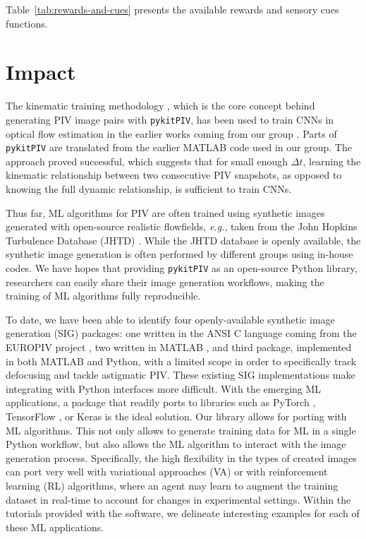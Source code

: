 \documentclass[a4paper,fleqn]{cas-dc}
\begin{document}
Table~\ref{tab:rewards-and-cues} presents the available rewards and sensory cues functions.

\section{Impact} \label{sec:results}

The kinematic training methodology \cite{manickathan2022kinematic}, which is the core concept behind generating PIV image pairs with \texttt{pykitPIV}, has been used to train CNNs in optical flow estimation in the earlier works coming from our group \cite{manickathan2022kinematic, manickathan2023lightweight, mucignat2023lightweight}. 
Parts of \texttt{pykitPIV} are translated from the earlier MATLAB code used in our group.
The approach proved successful, which suggests that for small enough $\Delta t$, learning the kinematic relationship between two consecutive PIV snapshots, as opposed to knowing the full dynamic relationship, is sufficient to train CNNs.

Thus far, ML algorithms for PIV are often trained using synthetic images generated with open-source realistic flowfields, \textit{e.g.}, taken from the John Hopkins Turbulence Database (JHTD) \cite{perlman2007data}. While the JHTD database is openly available, the synthetic image generation is often performed by different groups using in-house codes. We have hopes that providing \texttt{pykitPIV} as an open-source Python library, researchers can easily share their image generation workflows, making the training of ML algorithms fully reproducible.

\cite{mucignat2024respiratory}

To date, we have been able to identify four openly-available synthetic image generation (SIG) packages: one written in the ANSI C language coming from the EUROPIV project \cite{lecordier2004europiv}, two written in MATLAB \citep{ben2020openpiv, mendes2020piv}, and third package, implemented in both MATLAB and Python, with a limited scope in order to specifically track defocusing and tackle astigmatic PIV. These existing SIG implementations make integrating with Python interfaces more difficult. With the emerging ML applications, a package that readily ports to libraries such as PyTorch \cite{paszke2017automatic, paszke2019pytorch}, TensorFlow \cite{tensorflow2015}, or Keras \cite{chollet2015keras} is the ideal solution. Our library allows for porting with ML algorithms. This not only allows to generate training data for ML in a single Python workflow, but also allows the ML algorithm to interact with the image generation process. Specifically, the high flexibility in the types of created images can port very well with variational approaches (VA) or with reinforcement learning (RL) algorithms, where an agent may learn to augment the training dataset in real-time to account for changes in experimental settings. Within the tutorials provided with the software, we delineate interesting examples for each of these ML applications.
\end{document}
